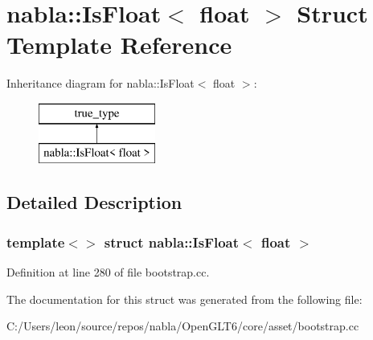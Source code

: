 \hypertarget{structnabla_1_1_is_float_3_01float_01_4}{}\section{nabla\+::Is\+Float$<$ float $>$ Struct Template Reference}
\label{structnabla_1_1_is_float_3_01float_01_4}
Inheritance diagram for nabla\+::Is\+Float$<$ float $>$\+:\begin{figure}[H]
\begin{center}
\leavevmode
\includegraphics[height=2.000000cm]{structnabla_1_1_is_float_3_01float_01_4}
\end{center}
\end{figure}


\subsection{Detailed Description}
\subsubsection*{template$<$$>$\newline
struct nabla\+::\+Is\+Float$<$ float $>$}



Definition at line 280 of file bootstrap.\+cc.



The documentation for this struct was generated from the following file\+:\begin{DoxyCompactItemize}
\item 
C\+:/\+Users/leon/source/repos/nabla/\+Open\+G\+L\+T6/core/asset/bootstrap.\+cc\end{DoxyCompactItemize}
